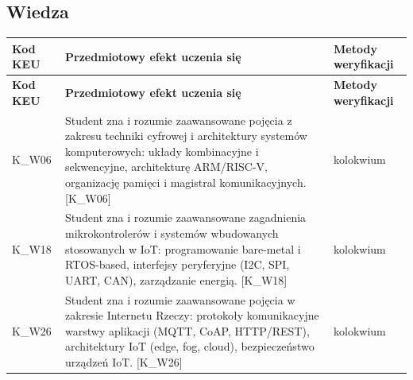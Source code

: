 \documentclass[12pt, a4paper]{article}
\newcommand{\thdrule}{\noalign{\global\setlength{\extrarowheight}{0pt}}}
\newcommand{\thdend}{\noalign{\global\setlength{\extrarowheight}{3pt}}}
\begin{document}
\subsection*{Wiedza}
{\scriptsize
\begin{longtable}{m{1.6cm}m{9.0cm}m{4.2cm}}
\thdrule\toprule
\rowcolor{pjatkRed} {\color{white}\footnotesize\textbf{\vphantom{Ag}Kod KEU}} & {\color{white}\footnotesize\textbf{\vphantom{Ag}Przedmiotowy efekt uczenia się}} & {\color{white}\footnotesize\textbf{\vphantom{Ag}Metody weryfikacji}} \\
\midrule\thdend
\endfirsthead
\thdrule\toprule
\rowcolor{pjatkRed} {\color{white}\footnotesize\textbf{\vphantom{Ag}Kod KEU}} & {\color{white}\footnotesize\textbf{\vphantom{Ag}Przedmiotowy efekt uczenia się}} & {\color{white}\footnotesize\textbf{\vphantom{Ag}Metody weryfikacji}} \\
\midrule\thdend
\endhead
  \rowcolor{tableRowLight} K\_W06 & Student zna i rozumie zaawansowane pojęcia z zakresu techniki cyfrowej i architektury systemów komputerowych: układy kombinacyjne i sekwencyjne, architekturę ARM/RISC-V, organizację pamięci i magistral komunikacyjnych. {[}K\_W06{]} & kolokwium \\
  \rowcolor{tableRowAlt} K\_W18 & Student zna i rozumie zaawansowane zagadnienia mikrokontrolerów i systemów wbudowanych stosowanych w IoT: programowanie bare-metal i RTOS-based, interfejsy peryferyjne (I2C, SPI, UART, CAN), zarządzanie energią. {[}K\_W18{]} & kolokwium \\
  \rowcolor{tableRowLight} K\_W26 & Student zna i rozumie zaawansowane pojęcia w zakresie Internetu Rzeczy: protokoły komunikacyjne warstwy aplikacji (MQTT, CoAP, HTTP/REST), architektury IoT (edge, fog, cloud), bezpieczeństwo urządzeń IoT. {[}K\_W26{]} & kolokwium \\
\bottomrule
\end{longtable}}
\end{document}
